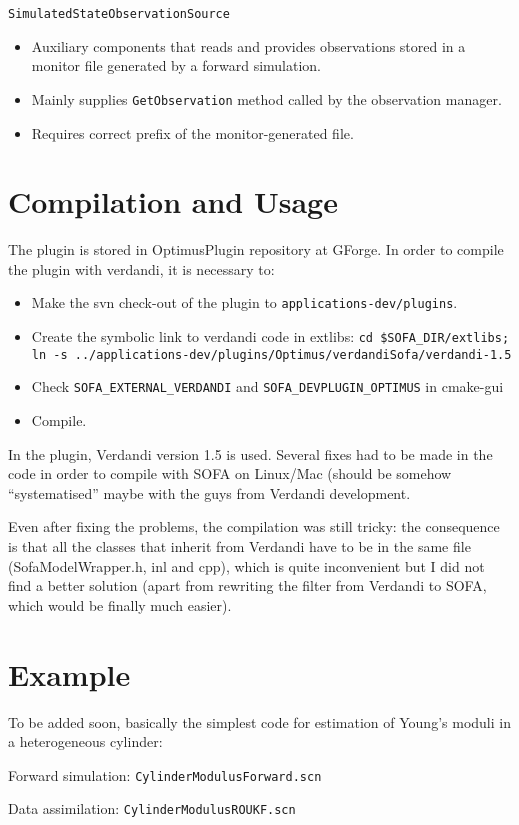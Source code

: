 \documentclass[10pt]{article}
\begin{document}
\medskip
{\large\texttt{SimulatedStateObservationSource}}
\begin{itemize}
\item Auxiliary components that reads and provides observations stored in a monitor file generated by a forward simulation.
\item Mainly supplies \texttt{GetObservation} method called by the observation manager. 
\item Requires correct prefix of the monitor-generated file. 
\end{itemize}

\section{Compilation and Usage}
The plugin is stored in OptimusPlugin repository at GForge. In order to compile the plugin with verdandi, it is necessary to:
\begin{itemize}
\item Make the svn check-out of the plugin to \texttt{applications-dev/plugins}.
\item Create the symbolic link to verdandi code in extlibs: \newline \texttt{cd \$SOFA\_DIR/extlibs; \newline ln -s ../applications-dev/plugins/Optimus/verdandiSofa/verdandi-1.5}
\item Check \texttt{SOFA\_EXTERNAL\_VERDANDI} and \texttt{SOFA\_DEVPLUGIN\_OPTIMUS} in cmake-gui
\item Compile.
\end{itemize}

In the plugin, Verdandi version 1.5 is used. Several fixes had to be made in the code in order to compile with SOFA on Linux/Mac (should be somehow ``systematised'' maybe with the guys from Verdandi development.

Even after fixing the problems, the compilation was still tricky: the consequence is that all the classes that inherit from Verdandi have to be in the same file (SofaModelWrapper.h, inl and cpp), which is quite inconvenient but I did not find a better solution (apart from rewriting the filter from Verdandi to SOFA, which would be finally much easier). 



\section{Example}
To be added soon, basically the simplest code for estimation of Young's moduli in a heterogeneous cylinder:

Forward simulation: \texttt{CylinderModulusForward.scn}

Data assimilation: \texttt{CylinderModulusROUKF.scn} 
\end{document}
